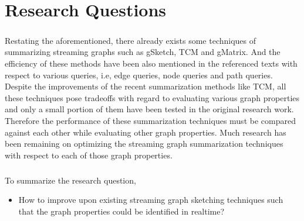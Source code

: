 \chapter{Research Questions}

\paragraph{}
Restating the aforementioned, there already exists some techniques of summarizing streaming graphs such as gSketch\cite{zhao_gsketch:_2011}, TCM\cite{tang_graph_2016} and gMatrix\cite{khan_query-friendly_2016}. And the efficiency of these methods have been also mentioned in the referenced texts with respect to various queries, i.e, edge queries, node queries and path queries. Despite the improvements of the recent summarization methods like TCM, all these techniques pose tradeoffs with regard to evaluating various graph properties and only a small portion of them have been tested in the original research work. Therefore the performance of these summarization techniques must be compared against each other while evaluating other graph properties. Much research has been remaining on optimizing the streaming graph summarization techniques with respect to each of those graph properties. 

\paragraph{}
To summarize the research question, 
\begin{itemize}
    \item How to improve upon existing streaming graph sketching techniques such that the graph properties could be identified in realtime? 
\end{itemize}